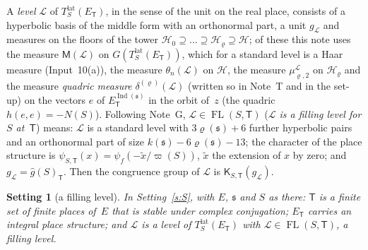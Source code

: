 \documentclass[11pt,a4paper]{article}
\newcommand{\m}[1]{\mbox{$#1$}}        %
\theoremstyle{plainx}
\theoremstyle{uprightx}
\newtheorem{setting}[theorem]{Setting}          %
\newcommand{\fs}{\mathfrak{s}}                      %
\newcommand{\sT}{\mathsf{T}}                        %
\newcommand{\cL}{\mathcal{L}}                       %
\newcommand{\rh}[1]{\varrho(#1)}                    %
\newcommand{\kk}[1]{k(#1)}                          %
\newcommand{\Ix}[1]{\operatorname{Ind}(#1)}                          %
\newcommand{\ET}[1]{E_{#1}}                         %
\newcommand{\NS}[1]{N(#1)}                          %
\newcommand{\vpS}[1]{\varpi(#1)}                    %
\newcommand{\Tlat}[2]{T^{\mathrm{lat}}_{#1}(#2)}    %
\newcommand{\gid}[1]{\hat{g}(#1)}                   %
\newcommand{\charT}[2]{\psi_{#1,#2}}                %
\newcommand{\FL}[2]{\operatorname{FL}(#1,#2)}       %
\newcommand{\KT}[3]{\mathsf{K}_{#1,#2}(#3)}                  %
\newcommand{\gM}[1]{\mathsf{M}(#1)}                 %
\newcommand{\mH}[1]{\theta_{n}(#1)}                 %
\newcommand{\quadric}[2]{\delta^{(#2)}(#1)}         %
\begin{document}
A \emph{level} $\cL$ of \m{\Tlat{S}{\ET{\sT}}}, in the sense of the unit on the real place, consists of a
hyperbolic basis of the middle form with an orthonormal part, a unit $g_{\cL}$ and measures on the floors of the
tower \m{\mathcal H_0\supseteq\dots\supseteq\mathcal H_\varrho\supseteq\mathcal H}; of these this note uses the
measure \m{\gM{\cL}} on \m{G(\Tlat{S}{\ET{\sT}})}, which for a standard level is a Haar measure
(Input~10(a)), the measure
\m{\mH{\cL}} on \m{\mathcal H}, the measure \m{\mu^{\cL}_{\varrho,2}} on \m{\mathcal H_\varrho} and the measure
\emph{quadric measure} \m{\quadric{\cL}{\varrho}} (written so in Note~T and in the set-up) on the vectors $e$ of
\m{\ET{\sT}^{\Ix{\fs}}} in the orbit of~$z$ (the quadric \m{h(e,e)=-\NS{S}}). Following Note~G, \m{\cL\in\FL{S}{\sT}} (\emph{$\cL$ is a filling level for $S$ at~$\sT$})
means: $\cL$ is a standard level with \m{3\rh{\fs}+6} further hyperbolic pairs and an orthonormal part of size
\m{\kk{\fs}-6\rh{\fs}-13}; the character of the place structure is
\m{\charT{S}{\sT}(x)=\psi_f(-\tilde x/\vpS{S})}, $\tilde x$ the extension of $x$ by zero; and
\m{g_{\cL}=\gid{S}_{\sT}}. Then the congruence group of $\cL$ is \m{\KT{S}{\sT}{g_{\cL}}}.

\begin{setting}[a filling level]\label{s:T}
In Setting~\ref{s:S}, with $E$, $\fs$ and $S$ as there: $\sT$ is a finite set of finite places of~$E$ that is
stable under complex conjugation;
\m{\ET{\sT}} carries an integral place structure; and $\cL$ is a level of \m{\Tlat{S}{\ET{\sT}}} with
\m{\cL\in\FL{S}{\sT}}, a filling level.
\end{setting}
\end{document}
